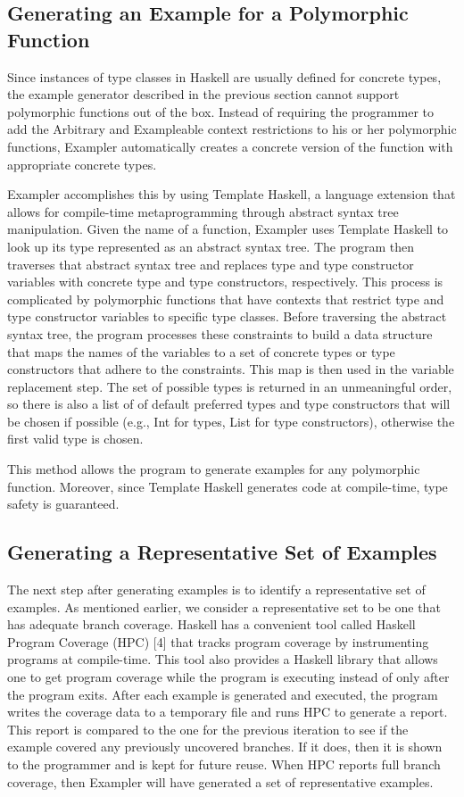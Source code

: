 \subsection{Generating an Example for a Polymorphic Function}

Since instances of type classes in Haskell are usually defined for concrete types, the example generator described in the previous section cannot support polymorphic functions out of the box.
Instead of requiring the programmer to add the Arbitrary and Exampleable context restrictions to his or her polymorphic functions, Exampler automatically creates a concrete version of the function with appropriate concrete types.

Exampler accomplishes this by using Template Haskell, a language extension that allows for compile-time metaprogramming through abstract syntax tree manipulation.
Given the name of a function, Exampler uses Template Haskell to look up its type represented as an abstract syntax tree.
The program then traverses that abstract syntax tree and replaces type and type constructor variables with concrete type and type constructors, respectively.
This process is complicated by polymorphic functions that have contexts that restrict type and type constructor variables to specific type classes.
Before traversing the abstract syntax tree, the program processes these constraints to build a data structure that maps the names of the variables to a set of concrete types or type constructors that adhere to the constraints.
This map is then used in the variable replacement step.
The set of possible types is returned in an unmeaningful order, so there is also a list of of default preferred types and type constructors that will be chosen if possible (e.g., Int for types, List for type constructors), otherwise the first valid type is chosen.

This method allows the program to generate examples for any polymorphic function.
Moreover, since Template Haskell generates code at compile-time, type safety is guaranteed.

\subsection{Generating a Representative Set of Examples}

The next step after generating examples is to identify a representative set of examples.
As mentioned earlier, we consider a representative set to be one that has adequate branch coverage.
Haskell has a convenient tool called Haskell Program Coverage (HPC) [4] that tracks program coverage by instrumenting programs at compile-time.
This tool also provides a Haskell library that allows one to get program coverage while the program is executing instead of only after the program exits.
After each example is generated and executed, the program writes the coverage data to a temporary file and runs HPC to generate a report.
This report is compared to the one for the previous iteration to see if the example covered any previously uncovered branches.
If it does, then it is shown to the programmer and is kept for future reuse.
When HPC reports full branch coverage, then Exampler will have generated a set of representative examples.


